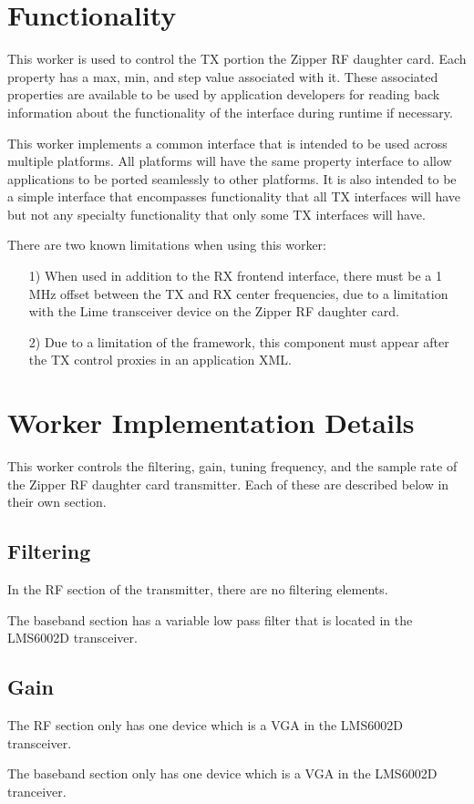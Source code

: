 \documentclass{article}
\begin{document}
\section*{Functionality}
\begin{flushleft}
   This worker is used to control the TX portion the Zipper RF daughter card. Each property has a max, min, and step value associated with it.  These associated properties are available to be used by application developers for reading back information about the functionality of the interface during runtime if necessary.\par\medskip
   This worker implements a common interface that is intended to be used across multiple platforms. All platforms will have the same property interface to allow applications to be ported seamlessly to other platforms. It is also intended to be a simple interface that encompasses functionality that all TX interfaces will have but not any specialty functionality that only some TX interfaces will have.\par\medskip
	There are two known limitations when using this worker:
	\begin{itemize}
		\item[1)] When used in addition to the RX frontend interface, there must be a 1 MHz offset between the TX and RX center frequencies, due to a limitation with the Lime transceiver device on the Zipper RF daughter card.
		\item[2)] Due to a limitation of the framework, this component must appear after the TX control proxies in an application XML.
	\end{itemize}

\section*{Worker Implementation Details}
This worker  controls the filtering, gain, tuning frequency, and the sample rate of the Zipper RF daughter card transmitter.  Each of these are described below in their own section.
\end{flushleft}
\subsection*{Filtering}
In the RF section of the transmitter, there are no filtering elements.\par\medskip
\noindent The baseband section has a variable low pass filter that is located in the LMS6002D transceiver.
\subsection*{Gain}
The RF section only has one device which is a VGA in the LMS6002D transceiver.\par\medskip
\noindent The baseband section only has one device which is a VGA in the LMS6002D tranceiver.
\end{document}
